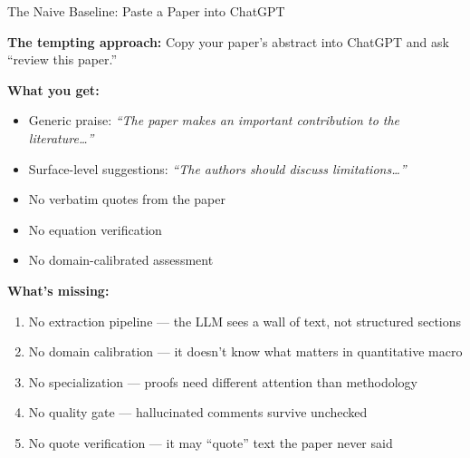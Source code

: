 \documentclass[10pt,english,aspectratio=169]{beamer}
\begin{document}
\begin{frame}{The Naive Baseline: Paste a Paper into ChatGPT}

\textbf{The tempting approach:} Copy your paper's abstract into ChatGPT and ask ``review this paper.''

\vspace{0.3cm}
\textbf{What you get:}
\begin{itemize}
    \item Generic praise: \textit{``The paper makes an important contribution to the literature\ldots''}
    \item Surface-level suggestions: \textit{``The authors should discuss limitations\ldots''}
    \item No verbatim quotes from the paper
    \item No equation verification
    \item No domain-calibrated assessment
\end{itemize}

\vspace{0.3cm}
\textbf{What's missing:}
\begin{enumerate}
    \item No extraction pipeline --- the LLM sees a wall of text, not structured sections
    \item No domain calibration --- it doesn't know what matters in quantitative macro
    \item No specialization --- proofs need different attention than methodology
    \item No quality gate --- hallucinated comments survive unchecked
    \item No quote verification --- it may ``quote'' text the paper never said
\end{enumerate}

\end{frame}
\end{document}
